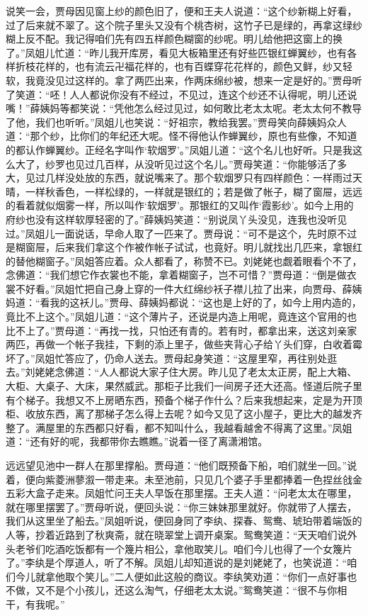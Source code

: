 \documentclass[12pt,oneside]{book}
\begin{document}
说笑一会，贾母因见窗上纱的颜色旧了，便和王夫人说道：“这个纱新糊上好看，过了后来就不翠了。这个院子里头又没有个桃杏树，这竹子已是绿的，再拿这绿纱糊上反不配。我记得咱们先有四五样颜色糊窗的纱呢。明儿给他把这窗上的换了。”凤姐儿忙道：“昨儿我开库房，看见大板箱里还有好些匹银红蝉翼纱，也有各样折枝花样的，也有流云卍福花样的，也有百蝶穿花花样的，颜色又鲜，纱又轻软，我竟没见过这样的。拿了两匹出来，作两床绵纱被，想来一定是好的。”贾母听了笑道：“呸！人人都说你没有不经过，不见过，连这个纱还不认得呢，明儿还说嘴！”薛姨妈等都笑说：“凭他怎么经过见过，如何敢比老太太呢。老太太何不教导了他，我们也听听。”凤姐儿也笑说：“好祖宗，教给我罢。”贾母笑向薛姨妈众人道：“那个纱，比你们的年纪还大呢。怪不得他认作蝉翼纱，原也有些像，不知道的都认作蝉翼纱。正经名字叫作‘软烟罗’。”凤姐儿道：“这个名儿也好听。只是我这么大了，纱罗也见过几百样，从没听见过这个名儿。”贾母笑道：“你能够活了多大，见过几样没处放的东西，就说嘴来了。那个软烟罗只有四样颜色：一样雨过天晴，一样秋香色，一样松绿的，一样就是银红的；若是做了帐子，糊了窗屉，远远的看着就似烟雾一样，所以叫作‘软烟罗’。那银红的又叫作‘霞影纱’。如今上用的府纱也没有这样软厚轻密的了。”薛姨妈笑道：“别说凤丫头没见，连我也没听见过。”凤姐儿一面说话，早命人取了一匹来了。贾母说：“可不是这个，先时原不过是糊窗屉，后来我们拿这个作被作帐子试试，也竟好。明儿就找出几匹来，拿银红的替他糊窗子。”凤姐答应着。众人都看了，称赞不已。刘姥姥也觑着眼看个不了，念佛道：“我们想它作衣裳也不能，拿着糊窗子，岂不可惜？”贾母道：“倒是做衣裳不好看。”凤姐忙把自己身上穿的一件大红绵纱袄子襟儿拉了出来，向贾母、薛姨妈道：“看我的这袄儿。”贾母、薛姨妈都说：“这也是上好的了，如今上用内造的，竟比不上这个。”凤姐儿道：“这个薄片子，还说是内造上用呢，竟连这个官用的也比不上了。”贾母道：“再找一找，只怕还有青的。若有时，都拿出来，送这刘亲家两匹，再做一个帐子我挂，下剩的添上里子，做些夹背心子给丫头们穿，白收着霉坏了。”凤姐忙答应了，仍命人送去。贾母起身笑道：“这屋里窄，再往别处逛去。”刘姥姥念佛道：“人人都说大家子住大房。昨儿见了老太太正房，配上大箱、大柜、大桌子、大床，果然威武。那柜子比我们一间房子还大还高。怪道后院子里有个梯子。我想又不上房晒东西，预备个梯子作什么？后来我想起来，定是为开顶柜、收放东西，离了那梯子怎么得上去呢？如今又见了这小屋子，更比大的越发齐整了。满屋里的东西都只好看，都不知叫什么，我越看越舍不得离了这里。”凤姐道：“还有好的呢，我都带你去瞧瞧。”说着一径了离潇湘馆。

远远望见池中一群人在那里撑船。贾母道：“他们既预备下船，咱们就坐一回。”说着，便向紫菱洲蓼溆一带走来。未至池前，只见几个婆子手里都捧着一色捏丝戗金五彩大盒子走来。凤姐忙问王夫人早饭在那里摆。王夫人道：“问老太太在哪里，就在哪里摆罢了。”贾母听说，便回头说：“你三妹妹那里就好。你就带了人摆去，我们从这里坐了船去。”凤姐听说，便回身同了李纨、探春、鸳鸯、琥珀带着端饭的人等，抄着近路到了秋爽斋，就在晓翠堂上调开桌案。鸳鸯笑道：“天天咱们说外头老爷们吃酒吃饭都有一个篾片相公，拿他取笑儿。咱们今儿也得了一个女篾片了。”李纨是个厚道人，听了不解。凤姐儿却知道说的是刘姥姥了，也笑说道：“咱们今儿就拿他取个笑儿。”二人便如此这般的商议。李纨笑劝道：“你们一点好事也不做，又不是个小孩儿，还这么淘气，仔细老太太说。”鸳鸯笑道：“很不与你相干，有我呢。”
\end{document}
